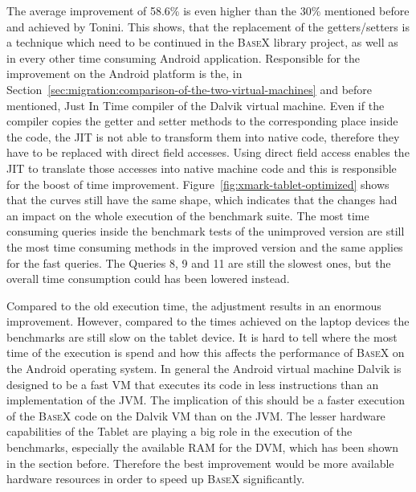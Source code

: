 The average improvement of 58.6\% is even higher than the 30\% mentioned before and achieved by Tonini\cite{toninievlautatingandroid}.
This shows, that the replacement of the getters/setters is a technique which need to be continued in the \textsc{BaseX} library project, as well as in every other time consuming Android application.
Responsible for the improvement on the Android platform is the, in Section~\ref{sec:migration:comparison-of-the-two-virtual-machines} and before mentioned, Just In Time compiler of the Dalvik virtual machine. 
Even if the compiler copies the getter and setter methods to the corresponding place inside the code, the JIT is not able to transform them into native code, therefore they have to be replaced with direct field accesses.
Using direct field access enables the JIT to translate those accesses into native machine code and this is responsible for the boost of time improvement.
Figure~\ref{fig:xmark-tablet-optimized} shows that the curves still have the same shape, which indicates that the changes had an impact on the whole execution of the benchmark suite.
The most time consuming queries inside the benchmark tests of the unimproved version are still the most time consuming methods in the improved version and the same applies for the fast queries.
The Queries 8, 9 and 11 are still the slowest ones, but the overall time consumption could has been lowered instead.



Compared to the old execution time, the adjustment results in an enormous improvement.
However, compared to the times achieved on the laptop devices the benchmarks are still slow on the tablet device.
It is hard to tell where the most time of the execution is spend and how this affects the performance of \textsc{BaseX} on the Android operating system.
In general the Android virtual machine Dalvik is designed to be a fast VM that executes its code in less instructions than an implementation of the JVM.
The implication of this should be a faster execution of the \textsc{BaseX} code on the Dalvik VM than on the JVM.
The lesser hardware capabilities of the Tablet are playing a big role in the execution of the benchmarks, especially the available RAM for the DVM, which has been shown in the section before.
Therefore the best improvement would be more available hardware resources in order to speed up \textsc{BaseX} significantly.



